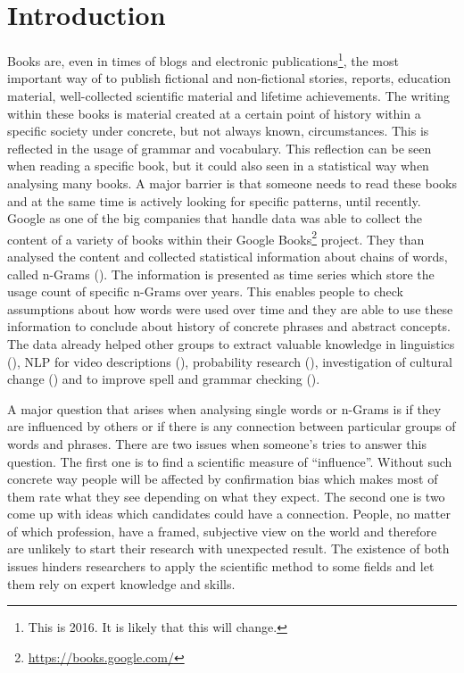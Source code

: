 \chapter{Introduction}
\label{ch:Introduction}

Books are, even in times of blogs and electronic publications\footnote{This is 2016. It is likely that this will change.}, the most important way of to publish fictional and non-fictional stories, reports, education material, well-collected scientific material and lifetime achievements. The writing within these books is material created at a certain point of history within a specific society under concrete, but not always known, circumstances. This is reflected in the usage of grammar and vocabulary. This reflection can be seen when reading a specific book, but it could also seen in a statistical way when analysing many books. A major barrier is that someone needs to read these books and at the same time is actively looking for specific patterns, until recently. Google as one of the big companies that handle data was able to collect the content of a variety of books within their Google Books\footnote{\url{https://books.google.com/}} project. They than analysed the content and collected statistical information about chains of words, called n-Grams (\cite{Google_nGrams}). The information is presented as time series which store the usage count of specific n-Grams over years. This enables people to check assumptions about how words were used over time and they are able to use these information to conclude about history of concrete phrases and abstract concepts. The data already helped other groups to extract valuable knowledge in linguistics (\cite{others1,others5,others7}), NLP for video descriptions (\cite{others2}), probability research (\cite{others3,others6}), investigation of cultural change (\cite{others4}) and to improve spell and grammar checking (\cite{languagetool}).

A major question that arises when analysing single words or n-Grams is if they are influenced by others or if there is any connection between particular groups of words and phrases. There are two issues when someone's tries to answer this question. The first one is to find a scientific measure of \enquote{influence}. Without such concrete way people will be affected by confirmation bias which makes most of them rate what they see depending on what they expect. The second one is two come up with ideas which candidates could have a connection. People, no matter of which profession, have a framed, subjective view on the world and therefore are unlikely to start their research with unexpected result. The existence of both issues hinders researchers to apply the scientific method to some fields and let them rely on expert knowledge and skills.

